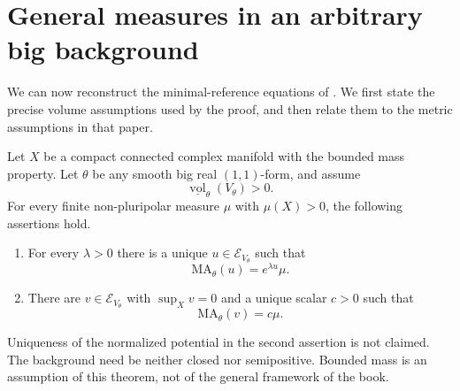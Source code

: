 \section{General measures in an arbitrary big background}
\label{sec:big-minimal-general-measures}

We can now reconstruct the minimal-reference equations of \cite[Theorems 5.2--5.3]{XL26}. We first state the precise volume assumptions used by the proof, and then relate them to the metric assumptions in that paper.

\begin{theorem}\label{thm:big-minimal-general-measures}
Let $X$ be a compact connected complex manifold with the bounded mass property. Let $\theta$ be any smooth big real $(1,1)$-form, and assume
\[
 \underline{\operatorname{vol}}_\theta(V_\theta)>0.
\]
For every finite non-pluripolar measure $\mu$ with $\mu(X)>0$, the following assertions hold.
\begin{enumerate}
\item For every $\lambda>0$ there is a unique $u\in\mathcal E_{V_\theta}$ such that
\[
 \mathrm{MA}_\theta(u)=e^{\lambda u}\mu.
\]
\item There are $v\in\mathcal E_{V_\theta}$ with $\sup_Xv=0$ and a unique scalar $c>0$ such that
\[
 \mathrm{MA}_\theta(v)=c\mu.
\]
\end{enumerate}
Uniqueness of the normalized potential in the second assertion is not claimed. The background need be neither closed nor semipositive. Bounded mass is an assumption of this theorem, not of the general framework of the book.
\end{theorem}
